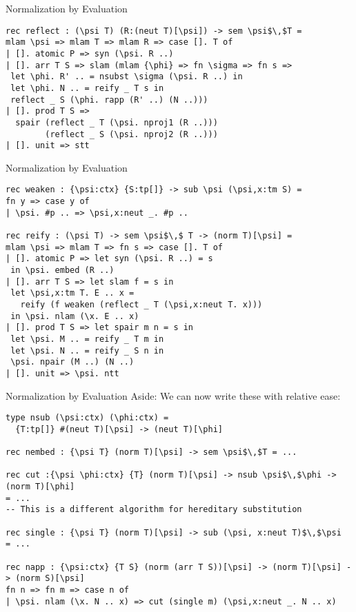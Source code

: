 \documentclass{beamer}
\begin{document}
\begin{frame}[fragile]{Normalization by Evaluation}
\begin{lstlisting}
rec reflect : (\psi T) (R:(neut T)[\psi]) -> sem \psi$\,$T =
mlam \psi => mlam T => mlam R => case []. T of
| []. atomic P => syn (\psi. R ..) 
| []. arr T S => slam (mlam {\phi} => fn \sigma => fn s =>
 let \phi. R' .. = nsubst \sigma (\psi. R ..) in
 let \phi. N .. = reify _ T s in
 reflect _ S (\phi. rapp (R' ..) (N ..)))
| []. prod T S =>
  spair (reflect _ T (\psi. nproj1 (R ..)))
        (reflect _ S (\psi. nproj2 (R ..)))
| []. unit => stt
\end{lstlisting}
\end{frame}

\begin{frame}[fragile]{Normalization by Evaluation}
\begin{lstlisting}
rec weaken : {\psi:ctx} {S:tp[]} -> sub \psi (\psi,x:tm S) =
fn y => case y of
| \psi. #p .. => \psi,x:neut _. #p ..

rec reify : (\psi T) -> sem \psi$\,$ T -> (norm T)[\psi] = 
mlam \psi => mlam T => fn s => case []. T of 
| []. atomic P => let syn (\psi. R ..) = s
 in \psi. embed (R ..)
| []. arr T S => let slam f = s in
 let \psi,x:tm T. E .. x =  
   reify (f weaken (reflect _ T (\psi,x:neut T. x)))
 in \psi. nlam (\x. E .. x)
| []. prod T S => let spair m n = s in
 let \psi. M .. = reify _ T m in
 let \psi. N .. = reify _ S n in
 \psi. npair (M ..) (N ..)
| []. unit => \psi. ntt
\end{lstlisting}
\end{frame}

\begin{frame}[fragile]{Normalization by Evaluation}
Aside: We can now write these with relative ease:
\begin{lstlisting}
type nsub (\psi:ctx) (\phi:ctx) =
  {T:tp[]} #(neut T)[\psi] -> (neut T)[\phi]

rec nembed : {\psi T} (norm T)[\psi] -> sem \psi$\,$T = ...

rec cut :{\psi \phi:ctx} {T} (norm T)[\psi] -> nsub \psi$\,$\phi -> (norm T)[\phi]
= ...
-- This is a different algorithm for hereditary substitution

rec single : {\psi T} (norm T)[\psi] -> sub (\psi, x:neut T)$\,$\psi
= ...

rec napp : {\psi:ctx} {T S} (norm (arr T S))[\psi] -> (norm T)[\psi] -> (norm S)[\psi]
fn n => fn m => case n of
| \psi. nlam (\x. N .. x) => cut (single m) (\psi,x:neut _. N .. x)
\end{lstlisting}
\end{frame}
\end{document}
